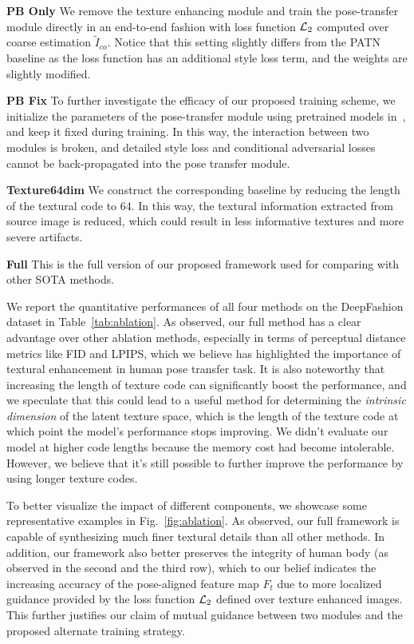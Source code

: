 \documentclass{article}
\begin{document}
\textbf{PB Only} We remove the texture enhancing module and train the pose-transfer module directly in an end-to-end fashion with loss function ${\cal L}_2$ computed over coarse estimation $\tilde{I}_{co}$. Notice that this setting slightly differs from the PATN~\cite{PATN} baseline as the loss function has an additional style loss term, and the weights are slightly modified.

\textbf{PB Fix} To further investigate the efficacy of our proposed training scheme, we initialize the parameters of the pose-transfer module using pretrained models in~\cite{PATN}, and keep it fixed during training. In this way, the interaction between two modules is broken, and detailed style loss and conditional adversarial losses cannot be back-propagated into the pose transfer module.

\textbf{Texture64dim} We construct the corresponding baseline by reducing the length of the textural code to 64. In this way, the textural information extracted from source image is reduced, which could result in less informative textures and more severe artifacts.

\textbf{Full} This is the full version of our proposed framework used for comparing with other SOTA methods.


We report the quantitative performances of all four methods on the DeepFashion dataset in Table~\ref{tab:ablation}. As observed, our full method has a clear advantage over other ablation methods, especially in terms of perceptual distance metrics like FID and LPIPS, which we believe has highlighted the importance of textural enhancement in human pose transfer task. It is also noteworthy that increasing the length of texture code can significantly boost the performance, and we speculate that this could lead to a useful method for determining the \emph{intrinsic dimension} of the latent texture space, which is the length of the texture code at which point the model's performance stops improving. We didn't evaluate our model at higher code lengths because the memory cost had become intolerable. However, we believe that it's still possible to further improve the performance by using longer texture codes.

To better visualize the impact of different components, we showcase some representative examples in Fig.~\ref{fig:ablation}. As observed, our full framework is capable of synthesizing much finer textural details than all other methods. In addition, our framework also better preserves the integrity of human body (as observed in the second and the third row), which to our belief indicates the increasing accuracy of the pose-aligned feature map $F_t$ due to more localized guidance provided by the loss function ${\cal L}_2$ defined over texture enhanced images. This further justifies our claim of mutual guidance between two modules and the proposed alternate training strategy.
\end{document}

